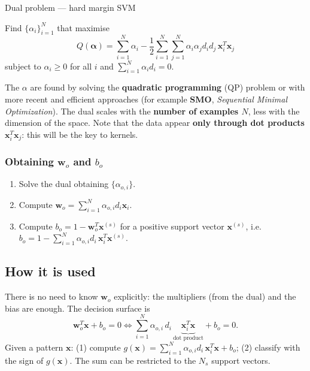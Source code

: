 \begin{boxdefinition}{Dual problem --- hard margin SVM}

Find \(\{\alpha_i\}_{i=1}^N\) that maximise \[
Q(\boldsymbol{\alpha}) = \sum_{i=1}^{N}\alpha_i - \frac{1}{2}\sum_{i=1}^{N}\sum_{j=1}^{N}\alpha_i\alpha_j d_i d_j\,\mathbf{x}_i^T\mathbf{x}_j
\] subject to \(\alpha_i \ge 0\) for all \(i\) and
\(\sum_{i=1}^{N}\alpha_i d_i = 0\).

\end{boxdefinition}

The \(\alpha\) are found by solving the \textbf{quadratic programming}
(QP) problem or with more recent and efficient approaches (for example
\textbf{SMO}, \emph{Sequential Minimal Optimization}). The dual scales
with the \textbf{number of examples \(N\)}, less with the dimension of
the space. Note that the data appear \textbf{only through dot products}
\(\mathbf{x}_i^T\mathbf{x}_j\): this will be the key to kernels.

\subsubsection{\texorpdfstring{Obtaining \(\mathbf{w}_o\) and
\(b_o\)}{Obtaining \textbackslash mathbf\{w\}\_o and b\_o}}\label{ottenere-mathbfw_o-e-b_o}

\begin{enumerate}
\def\labelenumi{\arabic{enumi}.}
\tightlist
\item
  Solve the dual obtaining \(\{\alpha_{o,i}\}\).
\item
  Compute \(\mathbf{w}_o = \sum_{i=1}^N\alpha_{o,i}d_i\mathbf{x}_i\).
\item
  Compute \(b_o = 1 - \mathbf{w}_o^T\mathbf{x}^{(s)}\) for a positive
  support vector \(\mathbf{x}^{(s)}\), i.e.\
  \(b_o = 1 - \sum_{i=1}^N\alpha_{o,i}d_i\,\mathbf{x}_i^T\mathbf{x}^{(s)}\).
\end{enumerate}

\subsection{How it is used}\label{come-si-usa}

There is no need to know \(\mathbf{w}_o\) explicitly: the multipliers
(from the dual) and the bias are enough. The decision surface is \[
\mathbf{w}_o^T\mathbf{x} + b_o = 0 \iff \sum_{i=1}^N\alpha_{o,i}\,d_i\,\underbrace{\mathbf{x}_i^T\mathbf{x}}_{\text{dot product}} + b_o = 0.
\] Given a pattern \(\mathbf{x}\): (1) compute
\(g(\mathbf{x}) = \sum_{i=1}^N\alpha_{o,i}d_i\,\mathbf{x}_i^T\mathbf{x} + b_o\);
(2) classify with the sign of \(g(\mathbf{x})\). The sum can be
restricted to the \(N_s\) support vectors.

